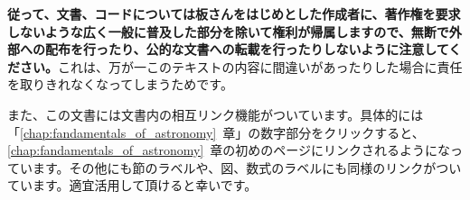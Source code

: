 \textbf{従って、文書、コードについては板さんをはじめとした作成者に、著作権を要求しないような広く一般に普及した部分を除いて権利が帰属しますので、無断で外部への配布を行ったり、公的な文書への転載を行ったりしないように注意してください。}これは、万が一このテキストの内容に間違いがあったりした場合に責任を取りきれなくなってしまうためです。

また、この文書には文書内の相互リンク機能がついています。具体的には「\ref{chap:fandamentals_of_astronomy}~章」の数字部分をクリックすると、\ref{chap:fandamentals_of_astronomy}~章の初めのページにリンクされるようになっています。その他にも節のラベルや、図、数式のラベルにも同様のリンクがついています。適宜活用して頂けると幸いです。